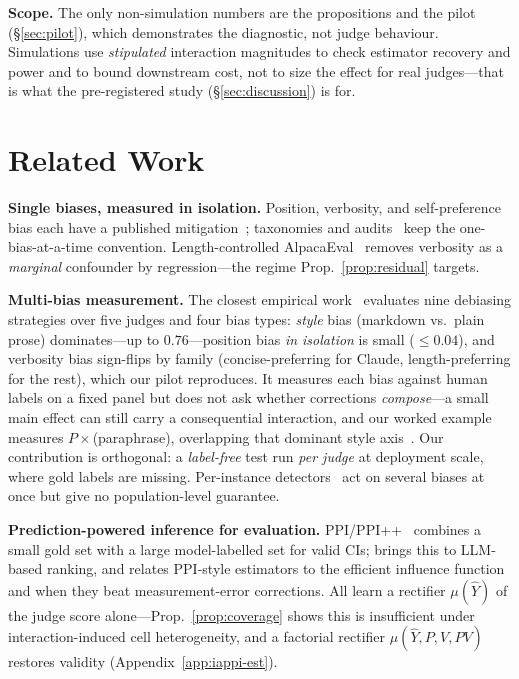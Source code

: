 \documentclass{article}
\begin{document}
\textbf{Scope.} The only non-simulation numbers are the propositions
and the pilot (\S\ref{sec:pilot}), which demonstrates the
diagnostic, not judge behaviour. Simulations use \emph{stipulated}
interaction magnitudes to check estimator recovery and power and to
bound downstream cost, not to size the effect for real
judges---that is what the pre-registered study
(\S\ref{sec:discussion}) is for.

\section{Related Work}
\label{sec:related}

\textbf{Single biases, measured in isolation.} Position, verbosity,
and self-preference bias each have a published
mitigation~\cite{zheng2023judging,wang2023fair,shi2024position,saito2023verbosity,dubois2024length,panickssery2024llm,selfpref2024};
taxonomies and audits~\cite{ye2024justice,gu2024survey,li2024generation,thakur2024judging}
keep the one-bias-at-a-time convention. Length-controlled
AlpacaEval~\cite{dubois2024length} removes verbosity as a
\emph{marginal} confounder by regression---the regime
Prop.~\ref{prop:residual} targets.

\textbf{Multi-bias measurement.} The closest empirical
work~\cite{mitigation2026} evaluates nine debiasing strategies over
five judges and four bias types: \emph{style} bias (markdown vs.\
plain prose) dominates---up to $0.76$---position bias
\emph{in isolation} is small ($\leq0.04$), and verbosity bias
sign-flips by family (concise-preferring for Claude,
length-preferring for the rest), which our pilot reproduces. It
measures each bias against human labels on a fixed panel but does
not ask whether corrections \emph{compose}---a small main effect can
still carry a consequential interaction, and our worked example
measures $P\times$(paraphrase), overlapping that dominant style
axis~\cite{wu2023style}. Our contribution is orthogonal: a
\emph{label-free} test run \emph{per judge} at deployment scale,
where gold labels are missing. Per-instance
detectors~\cite{biasdetector2025} act on several biases at once but
give no population-level guarantee.

\textbf{Prediction-powered inference for evaluation.}
PPI/PPI++~\cite{angelopoulos2023ppi,angelopoulos2024ppipp} combines
a small gold set with a large model-labelled set for valid CIs;
\cite{ppi_ranking2026} brings this to LLM-based ranking, and
\cite{eif_judge2026} relates PPI-style estimators to the efficient
influence function and when they beat measurement-error corrections.
All learn a rectifier $\mu(\hat Y)$ of the judge score
alone---Prop.~\ref{prop:coverage} shows this is insufficient under
interaction-induced cell heterogeneity, and a factorial rectifier
$\mu(\hat Y,P,V,PV)$ restores validity (Appendix~\ref{app:iappi-est}).
\end{document}
